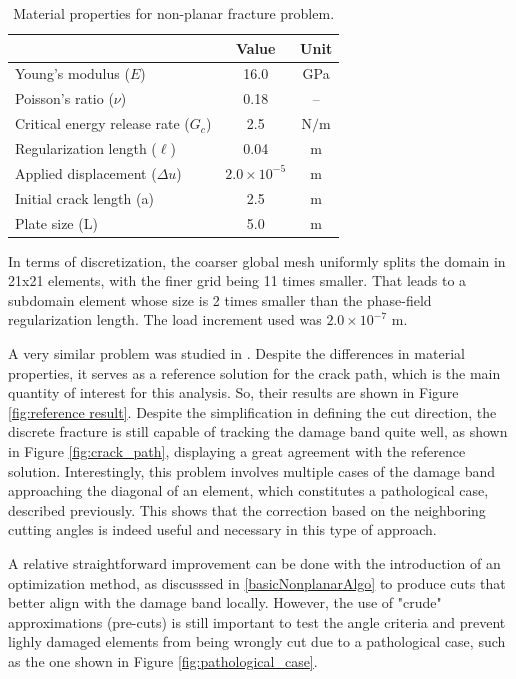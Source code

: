 \begin{table}[h]
    \centering
    \caption{Material properties for non-planar fracture problem.}
    \begin{tabular}[t]{lcc}
    \hline
    &Value &Unit \\
    \hline
    Young's modulus ($E$)&16.0&GPa\\
    Poisson's ratio ($\nu$)&0.18&--\\
    Critical energy release rate ($G_c$)&2.5&$\text{N/m}$\\
    Regularization length ($\ell$)&0.04&$\text{m}$\\
    Applied displacement ($\Delta u$)&$2.0\times 10^{-5}$&$\text{m}$\\
    Initial crack length (a)&2.5&$\text{m}$\\
    Plate size (L)&5.0&$\text{m}$\\
    \hline
    \end{tabular}
    \label{material properties nonplanar}
\end{table}%

In terms of discretization, the coarser global mesh uniformly splits the domain in 21x21 elements, with the finer grid being 11 times smaller. That leads to a subdomain element whose size is 2 times smaller than the phase-field regularization length. The load increment used was $2.0\times 10^{-7}$ m. 

A very similar problem was studied in \cite{giovanardi2017hybrid}. Despite the differences in material properties, it serves as a reference solution for the crack path, which is the main quantity of interest for this analysis. So, their results are shown in Figure \ref{fig:reference result}. Despite the simplification in defining the cut direction, the discrete fracture is still capable of tracking the damage band quite well, as shown in Figure \ref{fig:crack_path}, displaying a great agreement with the reference solution. Interestingly, this problem involves multiple cases of the damage band approaching the diagonal of an element, which constitutes a pathological case, described previously. This shows that the correction based on the neighboring cutting angles is indeed useful and necessary in this type of approach.

A relative straightforward improvement can be done with the introduction of an optimization method, as discusssed in \ref{basicNonplanarAlgo} to produce cuts that better align with the damage band locally. However, the use of "crude" approximations (pre-cuts) is still important to test the angle criteria and prevent lighly damaged elements from being wrongly cut due to a pathological case, such as the one shown in Figure \ref{fig:pathological_case}.

